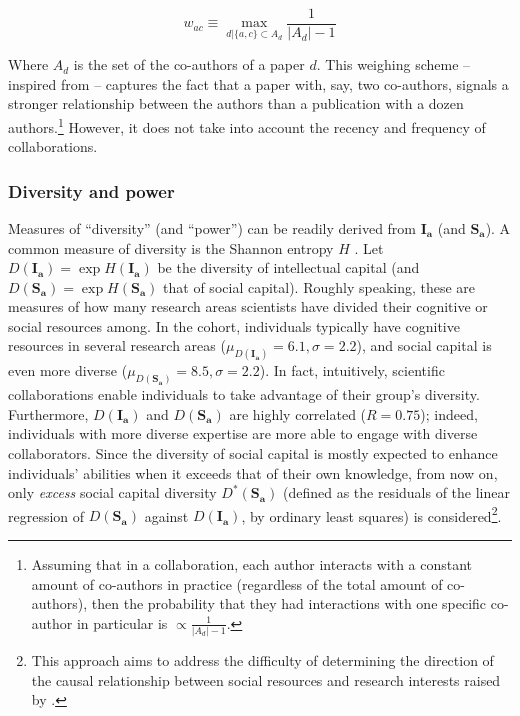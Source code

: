 \documentclass{article}
\begin{document}
\begin{equation}
    w_{ac} \equiv \max_{d|\{a,c\} \subset A_d} \frac{1}{|A_d|-1}
    \label{eq:weighing_scheme}
\end{equation}

Where $A_d$ is the set of the co-authors of a paper $d$. This weighing scheme -- inspired from \citealt{Newman2004} -- captures the fact that a paper with, say, two co-authors, signals a stronger relationship between the authors than a publication with a dozen authors.\footnote{Assuming that in a collaboration, each author interacts with a constant amount of co-authors in practice (regardless of the total amount of co-authors), then the probability that they had interactions with one specific co-author in particular is $\propto \frac{1}{|A_d|-1}$. 
} However, it does not take into account the recency and frequency of collaborations.

\subsubsection{Diversity and power}

Measures of ``diversity'' (and ``power'') can be readily derived from $\bm{I_a}$ (and $\bm{S_a}$). A common measure of diversity is the Shannon entropy $H$ \citep{Jost2006}. Let 
 $D(\bm{I_a})=\exp{H(\bm{I_a})}$ be the diversity of intellectual capital (and $D(\bm{S_a})=\exp{H(\bm{S_a})}$ that of social capital). Roughly speaking, these are measures of how many research areas scientists have
divided their cognitive or social resources among. In the cohort, individuals typically have cognitive resources in several research areas ($\mu_{D(\bm{I_a})}=6.1,\sigma=2.2$), and social capital is even more diverse ($\mu_{D(\bm{S_a})}=8.5,\sigma=2.2$). In fact, intuitively,  scientific collaborations enable individuals to take advantage of their group's diversity. Furthermore, $D(\bm{I_a})$ and $D(\bm{S_a})$ are highly correlated ($R=0.75$); indeed, individuals with more diverse expertise are more able to engage with diverse collaborators. Since the diversity of social capital is mostly expected to enhance individuals' abilities when it exceeds that of their own knowledge, from now on, only \textit{excess} social capital diversity $D^{\ast}(\bm{S_a})$ (defined as the residuals of the linear regression of $D(\bm{S_a})$ against $D(\bm{I_a})$, by ordinary least squares) is considered\footnote{This approach aims to address the difficulty of determining the direction of the causal relationship between social resources and research interests raised by \citet{Tripodi2020}.}.
\end{document}

